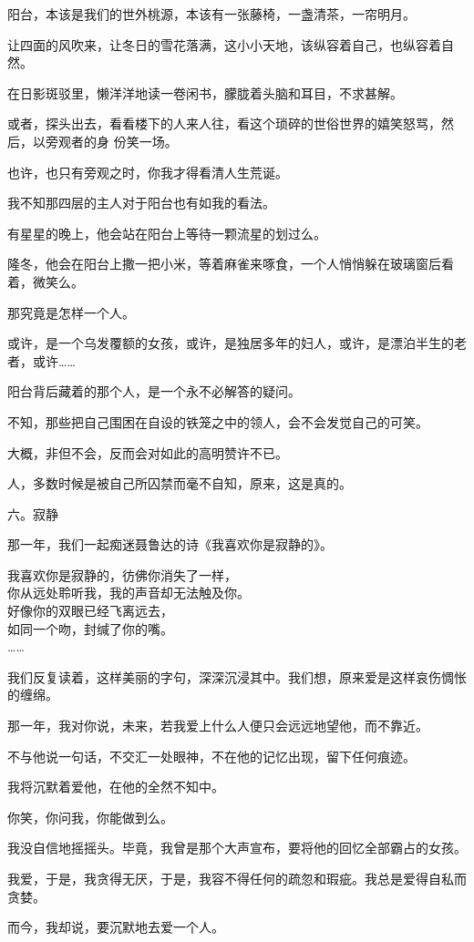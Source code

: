\documentclass[12pt,a4paper]{article}
\newcommand{\subpart}[1]{
	\begingroup \par
	\vspace{1ex} \centering #1
	\par \endgroup
}
\begin{document}
		阳台，本该是我们的世外桃源，本该有一张藤椅，一盏清茶，一帘明月。\par
		让四面的风吹来，让冬日的雪花落满，这小小天地，该纵容着自己，也纵容着自然。\par
		在日影斑驳里，懒洋洋地读一卷闲书，朦胧着头脑和耳目，不求甚解。

		或者，探头出去，看看楼下的人来人往，看这个琐碎的世俗世界的嬉笑怒骂，然后，以旁观者的身
	份笑一场。

		也许，也只有旁观之时，你我才得看清人生荒诞。\par
		我不知那四层的主人对于阳台也有如我的看法。\par
		有星星的晚上，他会站在阳台上等待一颗流星的划过么。\par
		隆冬，他会在阳台上撒一把小米，等着麻雀来啄食，一个人悄悄躲在玻璃窗后看着，微笑么。\par
		那究竟是怎样一个人。\par
		或许，是一个乌发覆额的女孩，或许，是独居多年的妇人，或许，是漂泊半生的老者，或许……\par
		阳台背后藏着的那个人，是一个永不必解答的疑问。\par
		不知，那些把自己围困在自设的铁笼之中的领人，会不会发觉自己的可笑。\par
		大概，非但不会，反而会对如此的高明赞许不已。\par
		人，多数时候是被自己所囚禁而毫不自知，原来，这是真的。


		\subpart{六。寂静}

		那一年，我们一起痴迷聂鲁达的诗《我喜欢你是寂静的》。

		\longpoem{}{}{}
		我喜欢你是寂静的，彷佛你消失了一样，\\
		你从远处聆听我，我的声音却无法触及你。\\
		好像你的双眼已经飞离远去，\\
		如同一个吻，封缄了你的嘴。\\
		……
		\endlongpoem

		我们反复读着，这样美丽的字句，深深沉浸其中。我们想，原来爱是这样哀伤惆怅的缠绵。\par
		那一年，我对你说，未来，若我爱上什么人便只会远远地望他，而不靠近。\par
		不与他说一句话，不交汇一处眼神，不在他的记忆出现，留下任何痕迹。\par
		我将沉默着爱他，在他的全然不知中。\par
		你笑，你问我，你能做到么。\par
		我没自信地摇摇头。毕竟，我曾是那个大声宣布，要将他的回忆全部霸占的女孩。\par
		我爱，于是，我贪得无厌，于是，我容不得任何的疏忽和瑕疵。我总是爱得自私而贪婪。\par
		而今，我却说，要沉默地去爱一个人。
\end{document}
